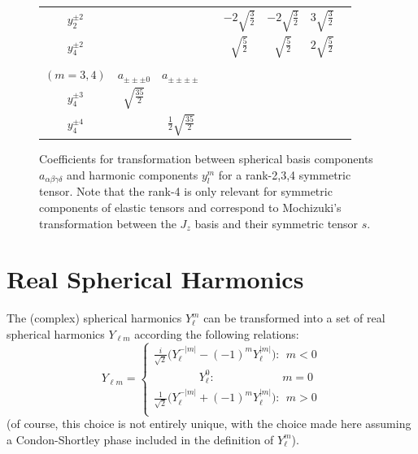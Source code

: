 \documentclass[10pt,a4paper]{article}
\begin{document}
\begin{figure}
\begin{tabular}{c|ccccccc}
$y_2^{\pm 2}$  & & & & $-2\sqrt{\frac{3}{2}}$ & $-2\sqrt{\frac{3}{2}}$ & $3\sqrt{\frac{3}{2}}$  \\
$y_4^{\pm 2}$ & & & & $\sqrt{\frac{5}{2}}$ & $\sqrt{\frac{5}{2}}$ & $2\sqrt{\frac{5}{2}}$  \\
\\
$(m=3,4)$& $a_{\pm\pm\pm 0}$ & $a_{\pm\pm\pm\pm}$  \\
$y_4^{\pm 3}$  & $\sqrt{\frac{35}{2}}$ &  \\
$y_4^{\pm 4}$  &  & $\frac{1}{2}\sqrt{\frac{35}{2}}$\\ 
\end{tabular}
\caption{Coefficients for transformation between spherical basis components $a_{\alpha\beta\gamma\delta}$ and harmonic components $y^m_l$ for a rank-2,3,4 symmetric tensor. Note that the rank-4 is only relevant for symmetric components of elastic tensors and correspond to Mochizuki's transformation \cite{mochizuki1988spherical} between the $J_z$ basis and their symmetric tensor $s$.}
\end{figure}

\section{Real Spherical Harmonics}\label{realsph}
The (complex) spherical harmonics $Y_{\ell}^m$ can be transformed into a set of real spherical harmonics $Y_{\ell m}$ according the following relations:
$$
Y_{\ell m }=
\begin{cases}
\frac{i}{\sqrt{2}}\big(Y_{\ell}^{-|m|} - (-1)^m Y_{\ell}^{|m|} \big):\ \ m<0\\
\quad\quad\quad\quad Y_{\ell}^0:\quad\quad\quad\quad\quad\ \ \  \ m=0\\
\frac{1}{\sqrt{2}}\big(Y_{\ell}^{-|m|} + (-1)^m Y_{\ell}^{|m|} \big):\ \ m>0\\
\end{cases}
$$
(of course, this choice is not entirely unique, with the choice made here assuming a Condon-Shortley phase included in the definition of $Y_{\ell}^m$).
\end{document}
